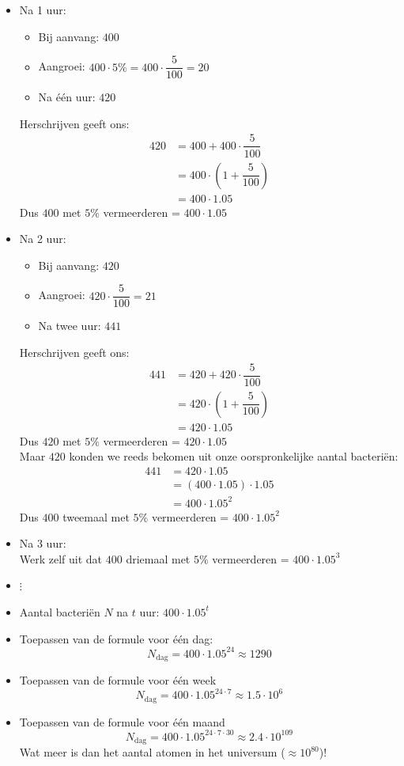 \documentclass[12pt,twoside,a4paper]{article}
\begin{document}
\begin{itemize}
\item Na 1 uur:
  \begin{itemize}
  \item Bij aanvang: $400$
  \item Aangroei: $400 \cdot 5\%=400 \cdot \dfrac{5}{100}=20$
  \item Na één uur: $420$
  \end{itemize}
  Herschrijven geeft ons:
  \begin{align*}
    420 &= 400 + 400 \cdot \dfrac{5}{100}\\
        &= 400 \cdot \left(1+\dfrac{5}{100}\right)\\
        &= 400 \cdot 1.05
  \end{align*}
  Dus $400$ met $5\%$ vermeerderen = $400 \cdot 1.05$
\item Na 2 uur:
  \begin{itemize}
  \item Bij aanvang: $420$
  \item Aangroei: $420 \cdot \dfrac{5}{100}=21$
  \item Na twee uur: $441$
  \end{itemize}
  Herschrijven geeft ons:
  \begin{align*}
    441 &= 420 + 420 \cdot \dfrac{5}{100}\\
        &= 420 \cdot \left(1+\dfrac{5}{100}\right)\\
        &= 420 \cdot 1.05
  \end{align*}
  Dus $420$ met $5\%$ vermeerderen = $420 \cdot 1.05$\\
  Maar $420$ konden we reeds bekomen uit onze oorspronkelijke aantal bacteriën:
  \begin{align*}
    441 &= 420 \cdot 1.05\\
        &= (400 \cdot 1.05) \cdot 1.05\\
        &= 400 \cdot 1.05^2
  \end{align*}
  Dus $400$ tweemaal met $5\%$ vermeerderen = $400 \cdot 1.05^2$
\item Na 3 uur:\\
  Werk zelf uit dat $400$ driemaal met $5\%$ vermeerderen = $400 \cdot 1.05^3$
\item[] $\vdots$
\item Aantal bacteriën $N$ na $t$ uur: $400 \cdot 1.05^t$
\item Toepassen van de formule voor één dag:
  $$N_{\mbox{dag}} = 400 \cdot 1.05^{24} \approx 1290$$
\item Toepassen van de formule voor één week
  $$N_{\mbox{dag}} = 400 \cdot 1.05^{24 \cdot 7} \approx 1.5 \cdot 10^6$$
\item Toepassen van de formule voor één maand
  $$N_{\mbox{dag}} = 400 \cdot 1.05^{24 \cdot 7 \cdot 30} \approx 2.4 \cdot 10^{109}$$
  Wat meer is dan het aantal atomen in het universum ($\approx 10^{80}$)!
\end{itemize}
\end{document}
